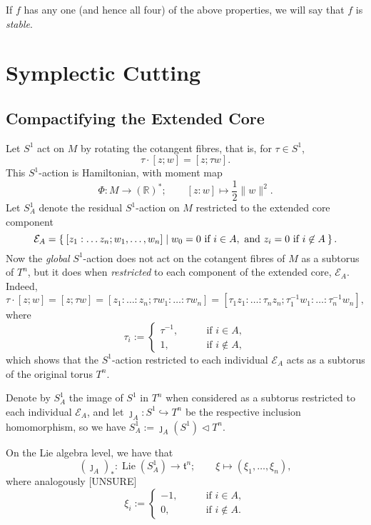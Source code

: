 \documentclass{article}
\newcommand{\lra}{\longrightarrow}
\newcommand{\RR}{\mathbb{R}}
\newcommand{\mcE}{\mathcal{E}}
\newcommand{\mft}{\mathfrak{t}}
\DeclareMathOperator{\Lie}{Lie}
\begin{document}
	If $f$ has any one (and hence all four) of the above properties, we will say that $f$ is \emph{stable}.
	
	\section{Symplectic Cutting}
	
	\subsection{Compactifying the Extended Core}
	
	Let $S^{1}$ act on $M$ by rotating the cotangent fibres, that is, for $\tau \in S^{1}$,
	\[
		\tau \cdot [z; w] = [z; \tau w].
	\]
	This $S^{1}$-action is Hamiltonian, with moment map
	\[
		\Phi : M \lra (\RR)^{\ast}; \qquad [z:w] \longmapsto \frac{1}{2} \|w\|^{2}.
	\]
	Let $S_{A}^{1}$ denote the residual $S^{1}$-action on $M$ restricted to the extended core component 
	\[
		\mcE_{A} = \Set{ [z_{1}: \ldots z_{n}; w_{1}, \ldots, w_{n}] | w_{0} = 0 \text{ if } i \in A, \text{ and } z_{i} = 0 \text{ if } i \not\in A }.
	\]
	Now the \emph{global }$S^{1}$-action does not act on the cotangent fibres of $M$ as a subtorus of $T^{n}$, but it does when \emph{restricted} to each component of the extended core, $\mcE_{A}$. Indeed,
	\[
		\tau \cdot [z; w] = [z; \tau w] = [z_{1} : \ldots : z_{n} ; \tau w_{1} : \ldots : \tau w_{n} ] = [\tau_{1 }z_{1} : \ldots : \tau_{n}z_{n} ; \tau_{1}^{-1}w_{1} : \ldots : \tau_{n}^{-1} w_{n} ],
	\]
	where
	\[
		\tau_{i} :=
		\begin{cases}
			\tau^{-1}, \qquad &\text{if } i \in A, \\
			1, \qquad &\text{if } i \not\in A,
		\end{cases}
	\]
	which shows that the $S^{1}$-action restricted to each individual $\mcE_{A}$ acts as a subtorus of the original torus $T^{n}$.
	
	Denote by $S_{A}^{1}$ the image of $S^{1}$ in $T^{n}$ when considered as a subtorus restricted to each individual $\mcE_{A}$, and let $\jmath_{A} : S^{1} \hookrightarrow T^{n}$ be the respective inclusion homomorphism, so we have $S_{A}^{1} := \jmath_{A}(S^{1}) \lhd T^{n}$.
	
	On the Lie algebra level, we have that
	\[
		(\jmath_{A})_{\ast} : \Lie(S_{A}^{1})  \lra \mft^{n}; \qquad \xi \longmapsto ( \xi_{1}, \ldots, \xi_{n}),
	\]
	where analogously [UNSURE]
	\[
		\xi_{i} :=
		\begin{cases}
			-1, \qquad &\text{if } i \in A, \\
			0, \qquad &\text{if } i \not\in A.
		\end{cases}
	\]
	
\end{document}

